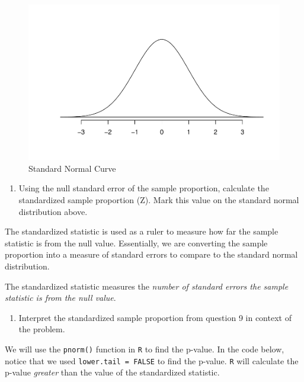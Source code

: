 \documentclass[
]{report}
\providecommand{\tightlist}{%
  \setlength{\itemsep}{0pt}\setlength{\parskip}{0pt}}
\begin{document}
\vspace{2mm}

\begin{figure}

{\centering \includegraphics[width=0.5\linewidth]{04-A09-inference-1cat-theory_files/figure-latex/Normcur-1} 

}

\caption{Standard Normal Curve}\label{fig:Normcur}
\end{figure}

\begin{enumerate}
\def\labelenumi{\arabic{enumi}.}
\setcounter{enumi}{8}
\tightlist
\item
  Using the null standard error of the sample proportion, calculate the standardized sample proportion (Z). Mark this value on the standard normal distribution above.
\end{enumerate}

\vspace{0.6in}

The standardized statistic is used as a ruler to measure how far the sample statistic is from the null value. Essentially, we are converting the sample proportion into a measure of standard errors to compare to the standard normal distribution.

The standardized statistic measures the \emph{number of standard errors the sample statistic is from the null value}.

\begin{enumerate}
\def\labelenumi{\arabic{enumi}.}
\setcounter{enumi}{9}
\tightlist
\item
  Interpret the standardized sample proportion from question 9 in context of the problem.
\end{enumerate}

\vspace{.8in}

We will use the \texttt{pnorm()} function in \texttt{R} to find the p-value. In the code below, notice that we used \texttt{lower.tail\ =\ FALSE} to find the p-value. \texttt{R} will calculate the p-value \emph{greater} than the value of the standardized statistic.
\end{document}
